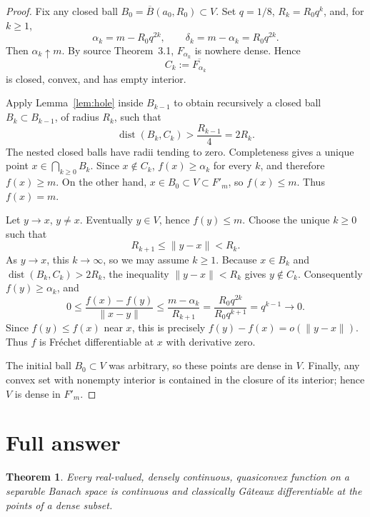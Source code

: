 \documentclass[11pt]{article}
\newtheorem{theorem}{Theorem}
\begin{document}
\begin{proof}
Fix any closed ball
\(B_0=\overline B(a_0,R_0)\subset V\). Set \(q=1/8\),
\(R_k=R_0q^k\), and, for \(k\ge1\),
\[
 \alpha_k=m-R_0q^{2k},\qquad \delta_k=m-\alpha_k=R_0q^{2k}.
\]
Then \(\alpha_k\uparrow m\). By source Theorem~3.1,
\(F_{\alpha_k}\) is nowhere dense. Hence
\[
 C_k:=\overline{F_{\alpha_k}}
\]
is closed, convex, and has empty interior.

Apply Lemma~\ref{lem:hole} inside \(B_{k-1}\) to obtain recursively a closed
ball \(B_k\subset B_{k-1}\), of radius \(R_k\), such that
\[
 \operatorname{dist}(B_k,C_k)>\frac{R_{k-1}}4=2R_k.
\]
The nested closed balls have radii tending to zero. Completeness gives a
unique point \(x\in\bigcap_{k\ge0}B_k\). Since \(x\notin C_k\),
\(f(x)\ge\alpha_k\) for every \(k\), and therefore \(f(x)\ge m\). On the
other hand, \(x\in B_0\subset V\subset F'_m\), so \(f(x)\le m\). Thus
\(f(x)=m\).

Let \(y\to x\), \(y\ne x\). Eventually \(y\in V\), hence \(f(y)\le m\).
Choose the unique \(k\ge0\) such that
\[
 R_{k+1}\le\|y-x\|<R_k.
\]
As \(y\to x\), this \(k\to\infty\), so we may assume \(k\ge1\). Because
\(x\in B_k\) and \(\operatorname{dist}(B_k,C_k)>2R_k\), the inequality
\(\|y-x\|<R_k\) gives \(y\notin C_k\). Consequently
\(f(y)\ge\alpha_k\), and
\[
 0\le
 \frac{f(x)-f(y)}{\|x-y\|}
 \le \frac{m-\alpha_k}{R_{k+1}}
 =\frac{R_0q^{2k}}{R_0q^{k+1}}
 =q^{k-1}\longrightarrow0.
\]
Since \(f(y)\le f(x)\) near \(x\), this is precisely
\(f(y)-f(x)=o(\|y-x\|)\). Thus \(f\) is Fr\'echet differentiable at \(x\)
with derivative zero.

The initial ball \(B_0\subset V\) was arbitrary, so these points are dense
in \(V\). Finally, any convex set with nonempty interior is contained in the
closure of its interior; hence \(V\) is dense in \(F'_m\).
\end{proof}

\section{Full answer}

\begin{theorem}\label{thm:full}
Every real-valued, densely continuous, quasiconvex function on a separable
Banach space is continuous and classically G\^ateaux differentiable at the
points of a dense subset.
\end{theorem}
\end{document}
